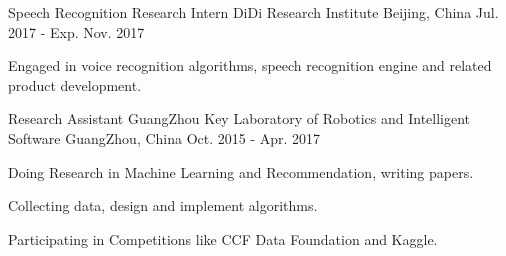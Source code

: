 \begin{cventries}
  \cventry
    {Speech Recognition Research Intern}
    {DiDi Research Institute}
    {Beijing, China}
    {Jul. 2017 - Exp. Nov. 2017}
    {
      \begin{cvitems}
        \item {Engaged in voice recognition algorithms, speech recognition engine and related product development.}
      \end{cvitems}
    }
  \cventry
    {Research Assistant}
    {GuangZhou Key Laboratory of Robotics and Intelligent Software}
    {GuangZhou, China}
    {Oct. 2015 - Apr. 2017}
    {
      \begin{cvitems}
        \item {Doing Research in Machine Learning and Recommendation, writing papers.}
        \item {Collecting data, design and implement algorithms.}
        \item {Participating in Competitions like CCF Data Foundation and Kaggle.}
      \end{cvitems}
    }
\end{cventries}